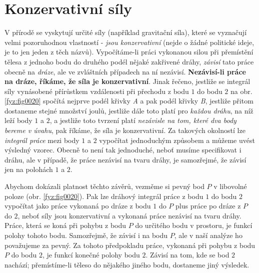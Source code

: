   \section{Konzervativní síly}
    V přírodě se vyskytují určité síly (například gravitační síla), které se vyznačují velmi 
    pozoruhodnou vlastností - \emph{jsou konzervativní} (nejde o žádné politické ideje, je to jen 
    jeden z těch  názvů).  Vypočítáme-li práci vykonanou silou při přemístění tělesa z 
    jednoho bodu do druhého podél nějaké zakřivené dráhy, \emph{závisí} tato práce obecně na 
    \emph{dráze}, ale ve zvláštních případech na ní nezávisí. \textbf{Nezávisí-li práce na dráze, 
    říkáme, že síla je konzervativní}. Jinak řečeno, jestliže se integrál síly vynásobené 
    přírůstkem vzdálenosti při přechodu z bodu \(1\) do bodu \(2\) na obr. \ref{fyz:fig0020} spočítá 
    nejprve podél křivky \emph{A} a pak podél křivky \emph{B}, jestliže přitom dostaneme stejné 
    množství joulů, jestliže dále toto platí pro \emph{každou dráhu}, na níž leží body \(1\) a 
    \(2\), a jestliže toto tvrzení platí \emph{nezávisle na tom, které dva body bereme v úvahu}, 
    pak říkáme, že síla je konzervativní. Za takových okolností lze \emph{integrál práce} mezi body 
    \(1\) a \(2\) vypočítat jednoduchým způsobem a můžeme uvést výsledný vzorec. Obecně to není tak 
    jednoduché, neboť musíme specifikovat i dráhu, ale v případě, že práce nezávisí na tvaru dráhy, 
    je samozřejmé, že závisí jen na polohách \(1\) a \(2\).
    

    Abychom dokázali platnost těchto závěrů, vezměme si pevný bod \(P\) v libovolné poloze (obr. 
    \ref{fyz:fig0020}). Pak lze dráhový integrál práce z bodu \(1\) do bodu \(2\) vypočítat jako 
    práce vykonaná po dráze z bodu \(1\) do \(P\) plus práce po dráze z \(P\) do \(2\), neboť síly 
    jsou konzervativní a vykonaná práce nezávisí na tvaru dráhy. Práce, která se koná při pohybu z 
    bodu \(P\) do určitého bodu v prostoru, je funkcí polohy tohoto bodu. Samozřejmě, že závisí i 
    na bodu \(P\), ale v naší analýze ho považujeme za pevný. Za tohoto předpokladu práce, vykonaná 
    při pohybu z bodu \(P\) do bodu \(2\), je funkcí konečné polohy bodu \(2\). Závisí na tom, kde 
    se bod \(2\) nachází; přemístíme-li těleso do nějakého jiného bodu, dostaneme jiný výsledek.

